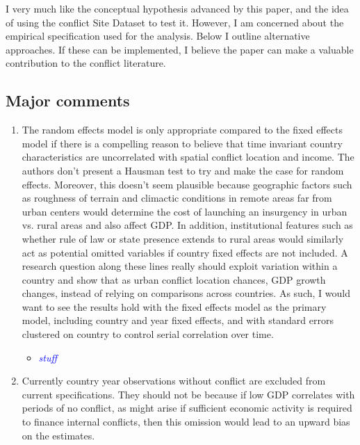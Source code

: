 \documentclass[12pt,onesided,fullpage]{amsart}
\begin{document}
I very much like the conceptual hypothesis advanced by this paper, and the idea of using the conflict Site Dataset to test it. However, I am concerned about the empirical specification used for the analysis. Below I outline alternative approaches. If these can be implemented, I believe the paper can make a valuable contribution to the conflict literature.


\subsection{Major comments}

\begin{enumerate}
\item The random effects model is only appropriate compared to the fixed effects model if there is a compelling reason to believe that time invariant country characteristics are uncorrelated with spatial conflict location and income. The authors don’t present a Hausman test to try and make the case for random effects. Moreover, this doesn’t seem plausible because geographic factors such as roughness of terrain and climactic conditions in remote areas far from urban centers would determine the cost of launching an insurgency in urban vs. rural areas and also affect GDP. In addition, institutional features such as whether rule of law or state presence extends to rural areas would similarly act as potential omitted variables if country fixed effects are not included. A research question along these lines really should exploit variation within a country and show that as urban conflict location chances, GDP growth changes, instead of relying on comparisons across countries. As such, I would want to see the results hold with the fixed effects model as the primary model, including country and year fixed effects, and with standard errors clustered on country to control serial correlation over time.

\begin{itemize}
\item \textcolor{blue}{\emph{stuff}}
\end{itemize}

\item Currently country year observations without conflict are excluded from current specifications. They should not be because if low GDP correlates with periods of no conflict, as might arise if sufficient economic activity is required to finance internal conflicts, then this omission would lead to an upward bias on the estimates.


\end{enumerate}
\end{document}
